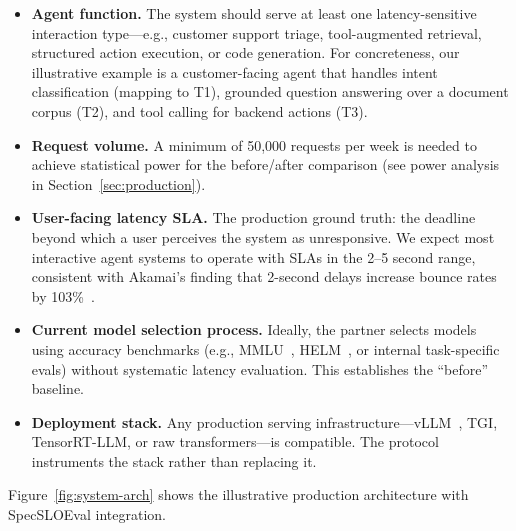 \documentclass[11pt]{article}
\begin{document}
\begin{itemize}[leftmargin=16pt]
    \item \textbf{Agent function.} The system should serve at least one latency-sensitive interaction type---e.g., customer support triage, tool-augmented retrieval, structured action execution, or code generation. For concreteness, our illustrative example is a customer-facing agent that handles intent classification (mapping to T1), grounded question answering over a document corpus (T2), and tool calling for backend actions (T3).
    \item \textbf{Request volume.} A minimum of 50,000 requests per week is needed to achieve statistical power for the before/after comparison (see power analysis in Section~\ref{sec:production}).
    \item \textbf{User-facing latency SLA.} The production ground truth: the deadline beyond which a user perceives the system as unresponsive. We expect most interactive agent systems to operate with SLAs in the 2--5 second range, consistent with Akamai's finding that 2-second delays increase bounce rates by 103\%~\cite{akamai2017performance}.
    \item \textbf{Current model selection process.} Ideally, the partner selects models using accuracy benchmarks (e.g., MMLU~\cite{hendrycks2021mmlu}, HELM~\cite{liang2023helm}, or internal task-specific evals) without systematic latency evaluation. This establishes the ``before'' baseline.
    \item \textbf{Deployment stack.} Any production serving infrastructure---vLLM~\cite{kwon2023vllm}, TGI, TensorRT-LLM, or raw transformers---is compatible. The protocol instruments the stack rather than replacing it.
\end{itemize}

Figure~\ref{fig:system-arch} shows the illustrative production architecture with SpecSLOEval integration.
\end{document}
